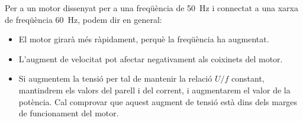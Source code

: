 Per a un motor dissenyat per a una freqüència de \qty{50}{Hz} i connectat a una xarxa de freqüència \qty{60}{Hz}, podem dir en general:
\begin{itemize}
	\item El motor girarà més ràpidament, perquè la freqüència ha augmentat.
	\item L'augment de velocitat pot  afectar negativament als coixinets  del motor.
	\item Si augmentem la tensió per tal de mantenir la relació $U/f$ constant, mantindrem els valors del parell i del corrent, i augmentarem el valor de la potència. Cal comprovar que aquest augment de tensió està dins dels marges de funcionament del motor.	
\end{itemize}